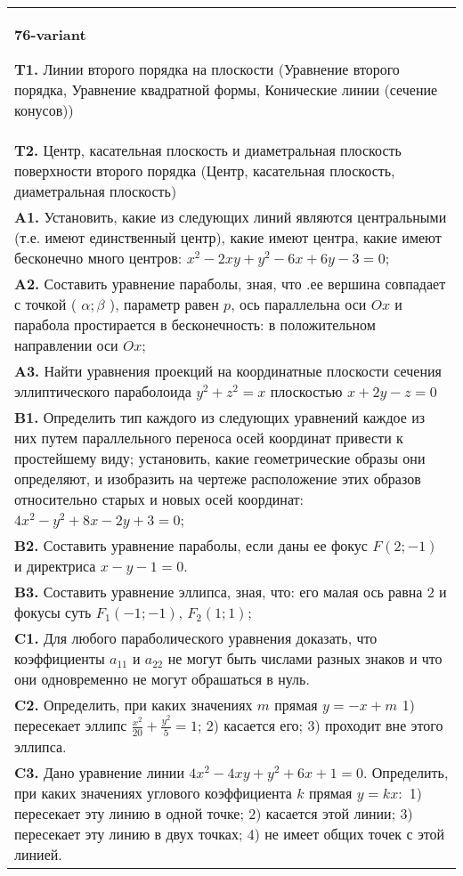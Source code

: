 \documentclass{article}
\begin{document}
\begin{tabular}{m{17cm}}
\textbf{76-variant}
\newline

\textbf{T1.} Линии второго порядка на плоскости (Уравнение второго порядка, Уравнение квадратной формы, Конические линии (сечение конусов)) \\
\textbf{T2.} Центр, касательная плоскость и диаметральная плоскость поверхности второго порядка (Центр, касательная плоскость, диаметральная плоскость) \\
\textbf{A1.} Установить, какие из следующих линий являются центральными (т.е. имеют единственный центр), какие имеют центра, какие имеют бесконечно много центров: $x^2-2 x y+y^2-6 x+6 y-3=0$; \\
\textbf{A2.} Составить уравнение параболы, зная, что .ее вершина совпадает с точкой ( $\alpha ; \beta$ ), параметр равен $p$, ось параллельна оси $O x$ и парабола простирается в бесконечность: в положительном направлении оси $O x$; \\
\textbf{A3.} Найти уравнения проекций на координатные плоскости сечения эллиптического параболоида $y^2+z^2=x$ плоскостью $x+2 y-z=0$ \\
\textbf{B1.} Определить тип каждого из следующих уравнений каждое из них путем параллельного переноса осей координат привести к простейшему виду; установить, какие геометрические образы они определяют, и изобразить на чертеже расположение этих образов относительно старых и новых осей координат: $4 x^2-y^2+8 x-2 y+3=0$; \\
\textbf{B2.} Составить уравнение параболы, если даны ее фокус $F(2 ;-1)$ и директриса $x-y-1=0$. \\
\textbf{B3.} Составить уравнение эллипса, зная, что: его малая ось равна 2 и фокусы суть $F_1(-1 ;-1)$, $F_2(1 ; 1)$; \\
\textbf{C1.} Для любого параболического уравнения доказать, что коэффициенты $a_{11}$ и $a_{22}$ не могут быть числами разных знаков и что они одновременно не могут обрашаться в нуль. \\
\textbf{C2.} Определить, при каких значениях $m$ прямая $y=-x+m$ 1) пересекает эллипс $\frac{x^2}{20}+\frac{y^2}{5}=1$; 2) касается его; 3) проходит вне этого эллипса. \\
\textbf{C3.} Дано уравнение линии $4 x^2-4 x y+y^2+6 x+1=0$. Определить, при каких значениях углового коэффициента $k$ прямая $y=k x:$ 1) пересекает эту линию в одной точке; 2) касается этой линии; 3) пересекает эту линию в двух точках; 4) не имеет общих точек с этой линией. \\

\end{tabular}
\vspace{1cm}
\end{document}
